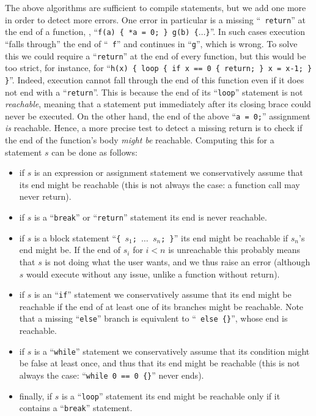 The above algorithms are sufficient to compile statements, but we add one more
in order to detect more errors. One error in particular is a missing ``{\tt
return}'' at the end of a function, \eg, ``{\tt f(a) \{ *a = 0; \} g(b)
\{$\ldots$\}}''. In such cases execution ``falls through'' the end of ``{\tt
f}'' and continues in ``{\tt g}'', which is wrong. To solve this we could
require a ``{\tt return}'' at the end of every function, but this would be too
strict, for instance, for ``{\tt h(x) \{ loop \{ if x == 0 \{ return; \} x =
x-1; \} \}}''. Indeed, execution cannot fall through the end of this function
even if it does not end with a ``{\tt return}''. This is because the end of its
``{\tt loop}'' statement is not {\em reachable}, meaning that a statement put
immediately after its closing brace could never be executed. On the other hand,
the end of the above ``{\tt *a = 0;}'' assignment {\em is} reachable. Hence, a
more precise test to detect a missing return is to check if the end of the
function's body {\em might be} reachable. Computing this for a statement $s$
can be done as follows:
\begin{itemize}
  \item if $s$ is an expression or assignment statement we conservatively
  assume that its end might be reachable (this is not always the case: a
  function call may never return).

  \item if $s$ is a ``{\tt break}'' or ``{\tt return}'' statement its end is
  never reachable.

  \item if $s$ is a block statement ``{\tt \{ $s_1$; $\ldots$ $s_n$; \}}'' its
  end might be reachable if $s_n$'s end might be. If the end of $s_i$ for $i<n$
  is unreachable this probably means that $s$ is not doing what the user
  wants, and we thus raise an error (although $s$ would execute without any
  issue, unlike a function without return).

  \item if $s$ is an ``{\tt if}'' statement we conservatively assume that its
  end might be reachable if the end of at least one of its branches might be
  reachable. Note that a missing ``{\tt else}'' branch is equivalent to ``{\tt
  else \{\}}'', whose end is reachable.

  \item if $s$ is a ``{\tt while}'' statement we conservatively assume that its
  condition might be false at least once, and thus that its end might be
  reachable (this is not always the case: ``{\tt while 0 == 0 \{\}}'' never
  ends).

  \item finally, if $s$ is a ``{\tt loop}'' statement its end might be
  reachable only if it contains a ``{\tt break}'' statement.
\end{itemize}

